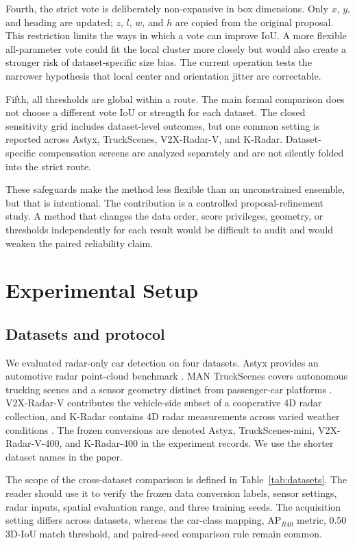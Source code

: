 \documentclass[final,5p,times]{elsarticle}
\newcommand{\tabref}[1]{\textcolor{floatreviewblue}{Table~\ref{#1}}}
\newcommand{\tabref}[1]{Table~\ref{#1}}
\begin{document}
Fourth, the strict vote is deliberately non-expansive in box dimensions.
Only $x$, $y$, and heading are updated; $z$, $l$, $w$, and $h$ are copied from
the original proposal. This restriction limits the ways in which a vote can
improve IoU. A more flexible all-parameter vote could fit the local cluster
more closely but would also create a stronger risk of dataset-specific size
bias. The current operation tests the narrower hypothesis that local center
and orientation jitter are correctable.

Fifth, all thresholds are global within a route. The main formal comparison
does not choose a different vote IoU or strength for each dataset. The closed
sensitivity grid includes dataset-level outcomes, but one common setting is
reported across Astyx, TruckScenes, V2X-Radar-V, and K-Radar. Dataset-specific
compensation screens are analyzed separately and are not silently folded into
the strict route.

These safeguards make the method less flexible than an unconstrained ensemble,
but that is intentional. The contribution is a controlled proposal-refinement
study. A method that changes the data order, score privileges, geometry, or
thresholds independently for each result would be difficult to audit and
would weaken the paired reliability claim.

\section{Experimental Setup}

\subsection{Datasets and protocol}

We evaluated radar-only car detection on four datasets. Astyx provides an
automotive radar point-cloud benchmark \cite{meyer2019astyx}. MAN TruckScenes
covers autonomous trucking scenes and a sensor geometry distinct from
passenger-car platforms \cite{fent2024truckscenes}.
V2X-Radar-V contributes the vehicle-side subset of a cooperative 4D radar
collection, and K-Radar contains 4D radar measurements across varied weather
conditions \cite{paek2022kradar,yang2024v2xradar}. The frozen conversions are
denoted Astyx, TruckScenes-mini, V2X-Radar-V-400, and K-Radar-400 in the
experiment records. We use the shorter dataset names in the paper.

The scope of the cross-dataset comparison is defined in
\tabref{tab:datasets}. The reader should use it to verify the frozen data
conversion labels, sensor settings, radar inputs, spatial evaluation range,
and three training seeds. The acquisition setting differs across datasets,
whereas the car-class mapping, AP$_{R40}$ metric, 0.50 3D-IoU match threshold,
and paired-seed comparison rule remain common.
\end{document}

